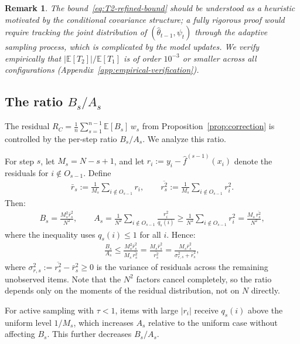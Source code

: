 \documentclass[11pt]{article}
\newtheorem{remark}[theorem]{Remark}
\newcommand{\thetahat}{\hat{\theta}}
\newcommand{\fhat}{\hat{f}}
\begin{document}
\begin{remark}
    The bound~\eqref{eq:T2-refined-bound} should be understood as a heuristic motivated by the conditional covariance structure; a fully rigorous proof would require tracking the joint distribution of $(\thetahat_{t-1}, \psi_t)$ through the adaptive sampling process, which is complicated by the model updates. We verify empirically that $|\mathbb{E}[T_2]|/\mathbb{E}[T_1]$ is of order $10^{-3}$ or smaller across all configurations (Appendix~\ref{app:empirical-verification}).
\end{remark}

\subsection{The ratio $B_s / A_s$}
\label{app:Bs-As-ratio}

The residual $R_C = \frac{1}{n}\sum_{s=1}^{n-1}\mathbb{E}[B_s]\,w_s$ from Proposition~\ref{prop:correction} is controlled by the per-step ratio $B_s/A_s$. We analyze this ratio.

For step $s$, let $M_s = N - s + 1$, and let $r_i := y_i - \fhat^{(s-1)}(x_i)$ denote the residuals for $i \notin O_{s-1}$. Define
\begin{align*}
    \bar{r}_s := \frac{1}{M_s}\sum_{i \notin O_{s-1}} r_i, \qquad \overline{r_s^2} := \frac{1}{M_s}\sum_{i \notin O_{s-1}} r_i^2.
\end{align*}
Then:
\begin{align*}
    B_s = \frac{M_s^2\bar{r}_s^2}{N^2}, \qquad A_s = \frac{1}{N^2}\sum_{i \notin O_{s-1}} \frac{r_i^2}{q_s(i)} \geq \frac{1}{N^2}\sum_{i \notin O_{s-1}} r_i^2 = \frac{M_s\,\overline{r_s^2}}{N^2},
\end{align*}
where the inequality uses $q_s(i) \leq 1$ for all $i$. Hence:
\begin{align}
\label{eq:Bs-over-As}
    \frac{B_s}{A_s} \leq \frac{M_s^2\bar{r}_s^2}{M_s\,\overline{r_s^2}} = \frac{M_s\bar{r}_s^2}{\overline{r_s^2}} = \frac{M_s\bar{r}_s^2}{\sigma_{r,s}^2 + \bar{r}_s^2},
\end{align}
where $\sigma_{r,s}^2 := \overline{r_s^2} - \bar{r}_s^2 \geq 0$ is the variance of residuals across the remaining unobserved items. Note that the $N^2$ factors cancel completely, so the ratio depends only on the moments of the residual distribution, not on $N$ directly.

For active sampling with $\tau < 1$, items with large $|r_i|$ receive $q_s(i)$ above the uniform level $1/M_s$, which increases $A_s$ relative to the uniform case without affecting $B_s$. This further decreases $B_s/A_s$.
\end{document}
